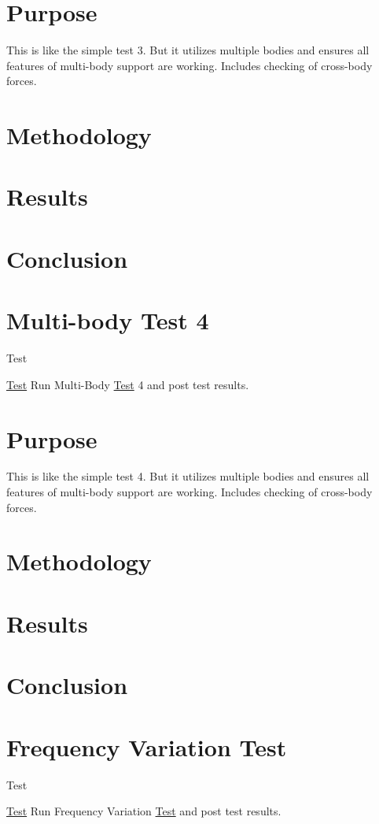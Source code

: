 \section*{Purpose}

This is like the simple test 3. But it utilizes multiple bodies and ensures all features of multi-\/body support are working. Includes checking of cross-\/body forces.

\section*{Methodology}

\section*{Results}

\section*{Conclusion}\hypertarget{MultiBodyTest4}{}\section{Multi-\/body Test 4}\label{MultiBodyTest4}
\begin{DoxyRefDesc}{Test}
\item[\hyperlink{test__test000004}{Test}]Run Multi-\/\-Body \hyperlink{class_test}{Test} 4 and post test results.\end{DoxyRefDesc}


\section*{Purpose}

This is like the simple test 4. But it utilizes multiple bodies and ensures all features of multi-\/body support are working. Includes checking of cross-\/body forces.

\section*{Methodology}

\section*{Results}

\section*{Conclusion}\hypertarget{TestFrequency}{}\section{Frequency Variation Test}\label{TestFrequency}
\begin{DoxyRefDesc}{Test}
\item[\hyperlink{test__test000009}{Test}]Run Frequency Variation \hyperlink{class_test}{Test} and post test results.\end{DoxyRefDesc}


